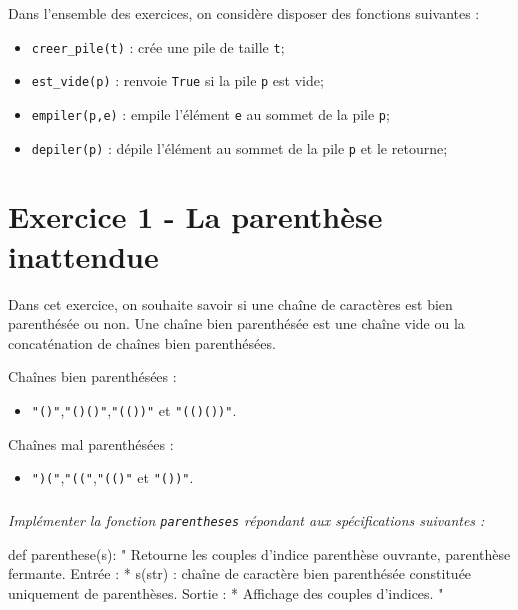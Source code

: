 \documentclass[10pt,fleqn]{article} %
\begin{document}

\vspace{8cm}
\pagestyle{fancy}
\thispagestyle{plain}


\def\columnseprulecolor{\color{ocre}}
\setlength{\columnseprule}{0.4pt} 
\begin{multicols}{2}
Dans l'ensemble des exercices, on considère disposer des fonctions suivantes :
\begin{itemize}
\item \texttt{creer\_pile(t)} : crée une pile de taille \texttt{t};
\item \texttt{est\_vide(p)} : renvoie \texttt{True} si la pile \texttt{p} est vide;
\item \texttt{empiler(p,e)} : empile l'élément \texttt{e} au sommet de la pile \texttt{p};
\item \texttt{depiler(p)} : dépile l'élément au sommet de la pile \texttt{p} et le retourne;
\end{itemize}
\section*{Exercice 1 - La parenthèse inattendue}
Dans cet exercice, on souhaite savoir si une chaîne de caractères est bien parenthésée ou non. 
Une chaîne bien parenthésée est une chaîne vide ou la concaténation de chaînes bien parenthésées. 
\begin{exemple}
Chaînes bien parenthésées :
\begin{itemize}
\item \texttt{"()"},\texttt{"()()"},\texttt{"(())"} et \texttt{"(()())"}.
\end{itemize}
Chaînes mal parenthésées :
\begin{itemize}
\item \texttt{")("},\texttt{"(("},\texttt{"(()"} et \texttt{"())"}.
\end{itemize}
\end{exemple} 

\subparagraph{}\textit{Implémenter la fonction \texttt{parentheses} répondant aux spécifications suivantes : }

\begin{py}
\begin{python}
def parenthese(s):
    "
    Retourne les couples d'indice parenthèse 
    ouvrante, parenthèse fermante.
    Entrée :
     * s(str) : chaîne de caractère bien 
     parenthésée constituée uniquement 
     de parenthèses.
    Sortie : 
     * Affichage des couples d'indices.
    "
\end{python}
\end{py}


\end{multicols}
\end{document}

